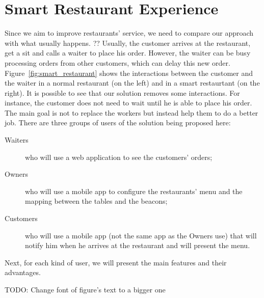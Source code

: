 
\section{Smart Restaurant Experience}
\label{sec:smart_restaurant_experience}

Since we aim to improve restaurants' service, we need to compare our approach
with what usually happens. ??
Usually, the customer arrives at the restaurant, get a sit and calls a waiter
to place his order. However, the waiter can be busy processing orders
from other customers, which can delay this new order.
Figure~\ref{fig:smart_restaurant} shows the interactions between the
customer and the waiter in a normal restaurant (on the left) and in
a smart restaurtant (on the right). It is possible to see that our
solution removes some interactions. For instance, the customer does not
need to wait until he is able to place his order.
The main goal is not to replace the workers but instead help them to do a
better job.
There are three groups of users of the solution being proposed here:

\begin{description}
  \item[Waiters] who will use a web application to see the customers'
  orders;
  \item[Owners] who will use a mobile app to configure the
  restaurants' menu and the mapping between the tables and the beacons;
  \item[Customers] who will use a mobile app (not the same app as the
  Owners use) that will notify him when he arrives at the restaurant and
  will present the menu.
\end{description}

Next, for each kind of user, we will present the main features and their
advantages.

TODO: Change font of figure's text to a bigger one

